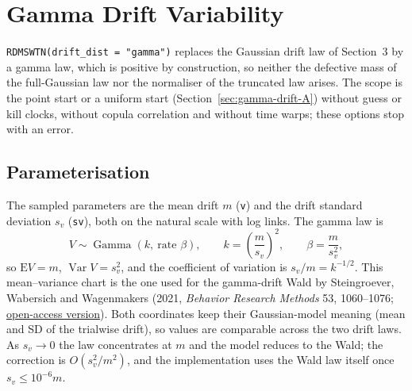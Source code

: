 \documentclass[12pt]{article}
\begin{document}
\section{Gamma Drift Variability}
\label{sec:gamma-drift}
\texttt{RDMSWTN(drift\_dist = "gamma")} replaces the Gaussian drift law of Section~3 by a gamma law, which is positive by construction, so neither the defective mass of the full-Gaussian law nor the normaliser of the truncated law arises. The scope is the point start or a uniform start (Section~\ref{sec:gamma-drift-A}) without guess or kill clocks, without copula correlation and without time warps; these options stop with an error.

\subsection{Parameterisation}
The sampled parameters are the mean drift $m$ (\texttt{v}) and the drift standard deviation $s_v$ (\texttt{sv}), both on the natural scale with log links. The gamma law is
\begin{equation}
  V\sim\operatorname{Gamma}(k,\ \text{rate }\beta),\qquad
  k=\left(\frac{m}{s_v}\right)^2,\qquad \beta=\frac{m}{s_v^2},
  \label{eq:gamma-param}
\end{equation}
so $\mathrm E V=m$, $\operatorname{Var}V=s_v^2$, and the coefficient of variation is $s_v/m=k^{-1/2}$. This mean--variance chart is the one used for the gamma-drift Wald by Steingroever, Wabersich and Wagenmakers (2021, \emph{Behavior Research Methods} 53, 1060--1076; \href{https://pmc.ncbi.nlm.nih.gov/articles/PMC8219596/}{open-access version}). Both coordinates keep their Gaussian-model meaning (mean and SD of the trialwise drift), so values are comparable across the two drift laws. As $s_v\to0$ the law concentrates at $m$ and the model reduces to the Wald; the correction is $O(s_v^2/m^2)$, and the implementation uses the Wald law itself once $s_v\le10^{-6}m$.
\end{document}
